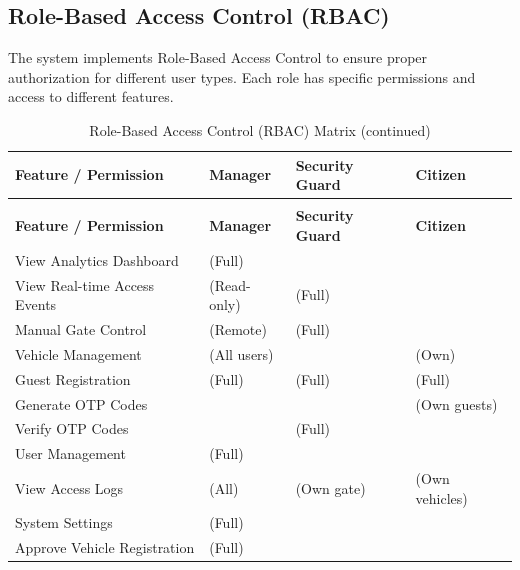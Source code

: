 \documentclass[a4paper]{article}
\newcommand{\cmark}{\ding{51}} %
\newcommand{\xmark}{\ding{55}} %
\begin{document}
\subsection{Role-Based Access Control (RBAC)}
The system implements Role-Based Access Control to ensure proper authorization for different user types. Each role has specific permissions and access to different features.

\begin{longtable}{@{}
    >{\raggedright\arraybackslash}p{}
    >{\centering\arraybackslash}p{}
    >{\centering\arraybackslash}p{}
    >{\centering\arraybackslash}p{} @{}}

    \caption{Role-Based Access Control (RBAC) Matrix}
    \label{tab:rbac_matrix} \\

    \toprule
    \textbf{Feature / Permission} & \textbf{Manager} & \textbf{Security Guard} & \textbf{Citizen} \\
    \midrule
    \endfirsthead

    \caption[]{Role-Based Access Control (RBAC) Matrix (continued)} \\
    \toprule
    \textbf{Feature / Permission} & \textbf{Manager} & \textbf{Security Guard} & \textbf{Citizen} \\
    \midrule
    \endhead

    \bottomrule
    \endlastfoot

    View Analytics Dashboard & \cmark (Full) & \xmark & \xmark \\
    \addlinespace
    View Real-time Access Events & \cmark (Read-only) & \cmark (Full) & \xmark \\
    \addlinespace
    Manual Gate Control & \cmark (Remote) & \cmark (Full) & \xmark \\
    \addlinespace
    Vehicle Management & \cmark (All users) & \xmark & \cmark (Own) \\
    \addlinespace
    Guest Registration & \cmark (Full) & \cmark (Full) & \cmark (Full) \\
    \addlinespace
    Generate OTP Codes & \xmark & \xmark & \cmark (Own guests) \\
    \addlinespace
    Verify OTP Codes & \xmark & \cmark (Full) & \xmark \\
    \addlinespace
    User Management & \cmark (Full) & \xmark & \xmark \\
    \addlinespace
    View Access Logs & \cmark (All) & \cmark (Own gate) & \cmark (Own vehicles) \\
    \addlinespace
    System Settings & \cmark (Full) & \xmark & \xmark \\
    \addlinespace
    Approve Vehicle Registration & \cmark (Full) & \xmark & \xmark \\
\end{longtable}
\end{document}
